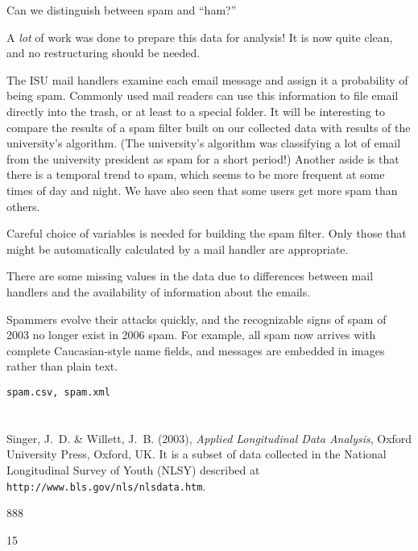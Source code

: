 \bigskip
{} Can we distinguish between spam and
``ham?''

\bigskip
{} A {\em lot} of work was done to
prepare this data for analysis! It is now quite clean, and no
restructuring should be needed.

\bigskip
{} The ISU mail handlers examine each
email message and assign it a probability of being spam. Commonly used
mail readers can use this information to file email directly into the
trash, or at least to a special folder. It will be interesting to
compare the results of a spam filter built on our collected data with
results of the university's algorithm. (The university's algorithm was
classifying a lot of email from the university president as spam for a
short period!) Another aside is that there is a temporal trend to
spam, which seems to be more frequent at some times of day and
night. We have also seen that some users get more spam than others.

Careful choice of variables is needed for building the spam
filter. Only those that might be automatically calculated by a mail
handler are appropriate.

There are some missing values in the data due to differences between
mail handlers and the availability of information about the emails.

Spammers evolve their attacks quickly, and the recognizable signs of
spam of 2003 no longer exist in 2006 spam. For example, all spam now
arrives with complete Caucasian-style name fields, and messages are
embedded in images rather than plain text.

\bigskip
{}

\smallskip 
{\tt  spam.csv, spam.xml}

\section{}

 Singer, J.~D. \& Willett, J.~B. (2003),
{\em Applied Longitudinal Data Analysis}, Oxford University Press,
Oxford, UK. It is a subset of data collected in the National
Longitudinal Survey of Youth (NLSY) described at {\tt
http://www.bls.gov/nls/nlsdata.htm}.  \nocite{SW03}

\bigskip
{} 888

 15

